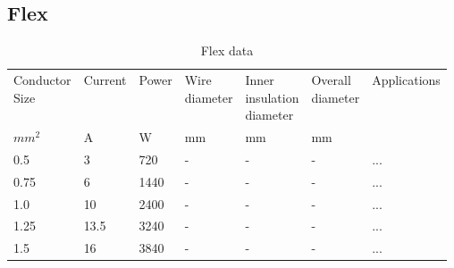 \subsection{Flex}
\begin{table}[h!]
    \footnotesize
\begin{longtable}{l|ll|ll|ll}
	\specialcell{Conductor\\Size}
    &Current
    &Power
	&\specialcell{Wire\\diameter}
	&\specialcell{Inner\\insulation\\diameter}
	&\specialcell{Overall\\diameter}
    &Applications
    \\
    $mm^2$
    &A
    &W
    &mm
	&mm
	&mm
	&
    \\
\hline
	0.5  &3    &720 &- &- &- &...\\
	0.75 &6    &1440&- &- &- &...\\
	1.0  &10   &2400&- &- &- &...\\
	1.25 &13.5 &3240&- &- &- &...\\
	1.5  &16   &3840&- &- &- &...\\
\end{longtable}
\caption{Flex data}
\end{table}
